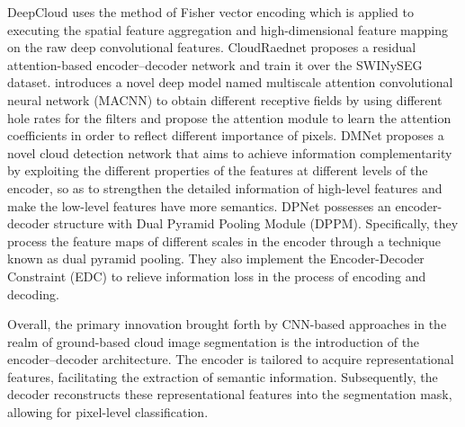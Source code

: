 \documentclass[amt, article]{copernicus}
\begin{document}
DeepCloud \citep{DeepCloud} uses the method of Fisher vector encoding which is applied to executing the spatial feature aggregation and high-dimensional feature mapping on the raw deep convolutional features.
CloudRaednet \citep{shi2022cloudraednet} proposes a residual attention-based encoder–decoder network and train it over the SWINySEG dataset.
\citep{MACNN} introduces a novel deep model named multiscale attention convolutional neural network (MACNN) to obtain different receptive fields by using different hole rates for the filters and propose the attention module to learn the attention coefficients in order to reflect different importance of pixels.
DMNet \citep{DMNet} proposes a novel cloud detection network that aims to achieve information complementarity by exploiting the different properties of the features at different levels of the encoder, so as to strengthen the detailed information of high-level features and make the low-level features have more semantics.
DPNet \citep{DPNet} possesses an encoder-decoder structure
with Dual Pyramid Pooling Module (DPPM). Specifically, they process the feature maps of different scales in the encoder through a technique known as dual pyramid pooling. They also implement the Encoder-Decoder Constraint (EDC) to relieve information loss in the process of encoding and decoding.

Overall, the primary innovation brought forth by CNN-based approaches in the realm of ground-based cloud image segmentation is the introduction of the encoder–decoder architecture. The encoder is tailored to acquire representational features, facilitating the extraction of semantic information. Subsequently, the decoder reconstructs these representational features into the segmentation mask, allowing for pixel-level classification.
\end{document}
